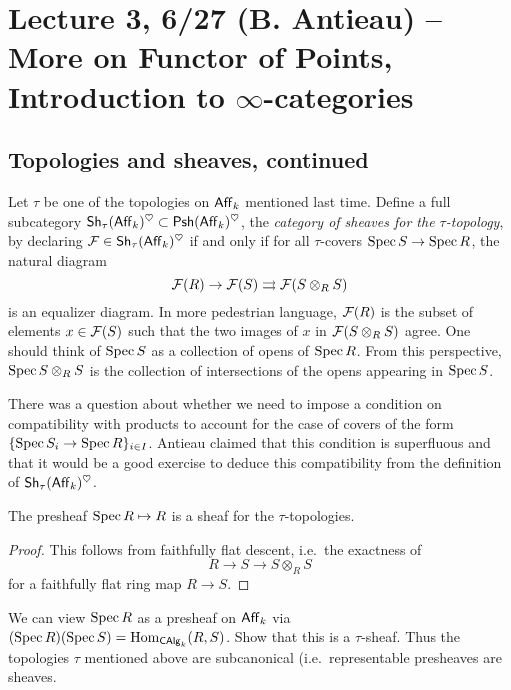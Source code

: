\documentclass{amsart}
\begin{document}
\section{Lecture 3, 6/27 (B. Antieau) -- More on Functor of Points, Introduction to $\infty$-categories}

\subsection{Topologies and sheaves, continued}

Let $\tau$ be one of the topologies on $\mathsf{Aff}_k$ mentioned last time.
Define a full subcategory $\mathsf{Sh}_\tau(\mathsf{Aff}_k)^\heartsuit \subset \mathsf{Psh}(\mathsf{Aff}_k)^\heartsuit$, the \emph{category of sheaves for the $\tau$-topology}, by declaring $\mathcal{F} \in \mathsf{Sh}_\tau(\mathsf{Aff}_k)^\heartsuit$ if and only if for all $\tau$-covers $\operatorname{Spec} S \to \operatorname{Spec} R$, the natural diagram
\[
	\mathcal{F}(R) \to \mathcal{F}(S) \rightrightarrows \mathcal{F}(S \otimes_R S)
\]
is an equalizer diagram.
In more pedestrian language, $\mathcal{F}(R)$ is the subset of elements $x \in \mathcal{F}(S)$ such that the two images of $x$ in $\mathcal{F}(S \otimes_R S)$ agree.
One should think of $\operatorname{Spec} S$ as a collection of opens of $\operatorname{Spec} R$.
From this perspective, $\operatorname{Spec} S \otimes_R S$ is the collection of intersections of the opens appearing in $\operatorname{Spec} S$.

There was a question about whether we need to impose a condition on compatibility with products to account for the case of covers of the form $\{ \operatorname{Spec} S_i \to \operatorname{Spec} R \}_{i \in I}$.
Antieau claimed that this condition is superfluous and that it would be a good exercise to deduce this compatibility from the definition of $\mathsf{Sh}_\tau(\mathsf{Aff}_k)^\heartsuit$.

\begin{thm}[Grothendieck]
The presheaf $\operatorname{Spec} R \mapsto R$ is a sheaf for the $\tau$-topologies.
\end{thm}

\begin{proof}
This follows from faithfully flat descent, i.e.\ the exactness of
\[
R \to S \to S \otimes_R S
\]
for a faithfully flat ring map $R \to S$.
\end{proof}

\begin{exer}
We can view $\operatorname{Spec} R$ as a presheaf on $\mathsf{Aff}_k$ via $(\operatorname{Spec} R)(\operatorname{Spec} S) = \operatorname{Hom}_{\mathsf{CAlg}_k}(R, S)$.
Show that this is a $\tau$-sheaf.
Thus the topologies $\tau$ mentioned above are subcanonical (i.e.\ representable presheaves are sheaves.
\end{exer}
\end{document}
